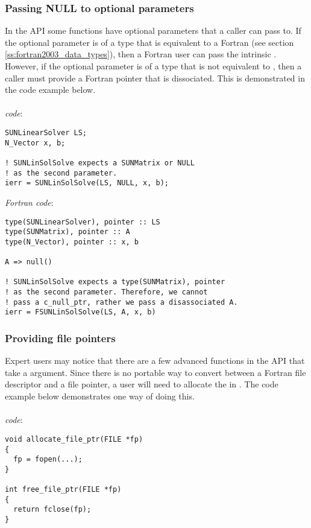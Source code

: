 \subsubsection{Passing NULL to optional parameters}

In the {\sundials} {\CC} API some functions have optional parameters that a
caller can pass  to. If the optional parameter is of a type that is
equivalent to a Fortran  (see section \ref{ss:fortran2003_data_types}),
then a Fortran user can pass the intrinsic . However, if the
optional parameter is of a type that is not equivalent to ,
then a caller must provide a Fortran pointer that is dissociated. This
is demonstrated in the code example below.
\\
\\
\noindent \emph{{\CC} code}:
\begin{verbatim}
SUNLinearSolver LS;
N_Vector x, b;

! SUNLinSolSolve expects a SUNMatrix or NULL
! as the second parameter.
ierr = SUNLinSolSolve(LS, NULL, x, b);
\end{verbatim}

\noindent \emph{Fortran code}:
\begin{verbatim}
type(SUNLinearSolver), pointer :: LS
type(SUNMatrix), pointer :: A
type(N_Vector), pointer :: x, b

A => null()

! SUNLinSolSolve expects a type(SUNMatrix), pointer
! as the second parameter. Therefore, we cannot
! pass a c_null_ptr, rather we pass a disassociated A.
ierr = FSUNLinSolSolve(LS, A, x, b)
\end{verbatim}


\subsubsection{Providing file pointers}

Expert {\sundials} users may notice that there are a few advanced functions in the {\sundials}
{\CC} API that take a  argument. Since there is no portable way to convert between
a Fortran file descriptor and a {\CC} file pointer, a user will need to allocate the
 in {\CC}. The code example below demonstrates one way of doing this.
\\
\\
\noindent \emph{{\CC} code}:
\begin{verbatim}
void allocate_file_ptr(FILE *fp)
{
  fp = fopen(...);
}

int free_file_ptr(FILE *fp)
{
  return fclose(fp);
}
\end{verbatim}

